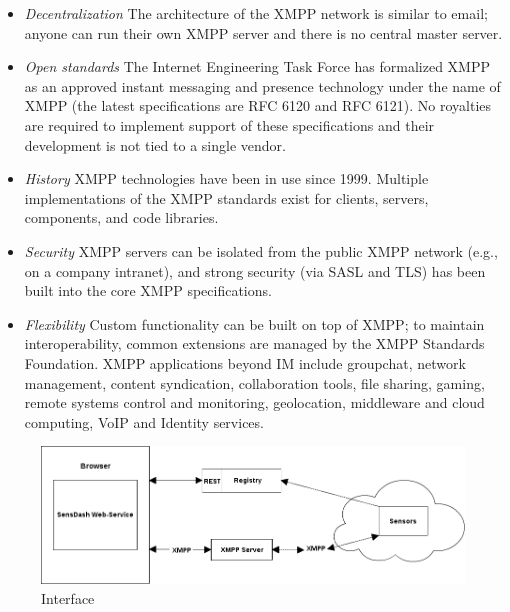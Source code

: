     \begin{itemize}
      \item \emph{Decentralization}
        The architecture of the XMPP network is similar to email; anyone can run their own XMPP server and there is no central master server.
    
      \item \emph{Open standards}
          The Internet Engineering Task Force has formalized XMPP as an approved instant messaging and presence technology under the name of XMPP (the latest specifications are RFC 6120 and RFC 6121). No royalties are required to implement support of these specifications and their development is not tied to a single vendor.
      \item \emph{History}
        XMPP technologies have been in use since 1999. Multiple implementations of the XMPP standards exist for clients, servers, components, and code libraries.
      \item \emph{Security}
           XMPP servers can be isolated from the public XMPP network (e.g., on a company intranet), and strong security (via SASL and TLS) has been built into the core XMPP specifications.
      \item \emph{Flexibility}
           Custom functionality can be built on top of XMPP; to maintain interoperability, common extensions are managed by the XMPP Standards Foundation. XMPP applications beyond IM include groupchat, network management, content syndication, collaboration tools, file sharing, gaming, remote systems control and monitoring, geolocation, middleware and cloud computing, VoIP and Identity services.
      \end{itemize}


      \begin{figure}[!ht]
      \centering
      \includegraphics[scale=0.5]{images/Interface.png}   
      \caption[Interface]{Interface}
      \label{img:interfaces}                           
      \end{figure}

